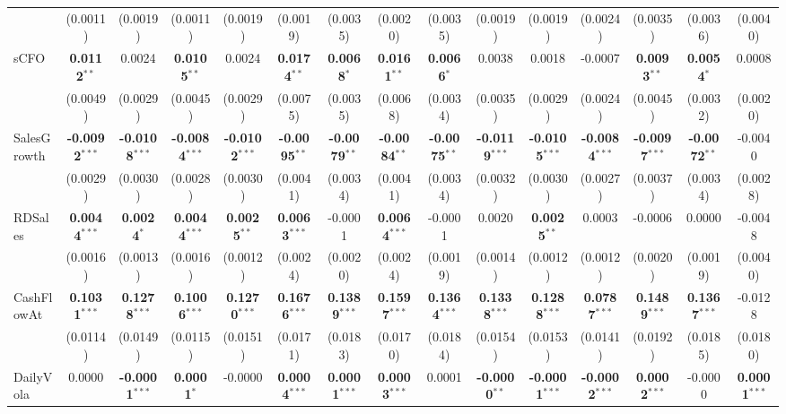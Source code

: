 \documentclass[11pt,a4paper]{article}
\begin{document}
\begin{table}[htbp]
\begin{tabular}{lcccccccccccccc}
 & (0.0011) & (0.0019) & (0.0011) & (0.0019) & (0.0019) & (0.0035) & (0.0020) & (0.0035) & (0.0019) & (0.0019) & (0.0024) & (0.0035) & (0.0036) & (0.0040) \\
sCFO & \textbf{0.0112}$^{**}$ & 0.0024 & \textbf{0.0105}$^{**}$ & 0.0024 & \textbf{0.0174}$^{**}$ & \textbf{0.0068}$^{*}$ & \textbf{0.0161}$^{**}$ & \textbf{0.0066}$^{*}$ & 0.0038 & 0.0018 & -0.0007 & \textbf{0.0093}$^{**}$ & \textbf{0.0054}$^{*}$ & 0.0008 \\
 & (0.0049) & (0.0029) & (0.0045) & (0.0029) & (0.0075) & (0.0035) & (0.0068) & (0.0034) & (0.0035) & (0.0029) & (0.0024) & (0.0045) & (0.0032) & (0.0020) \\
SalesGrowth & \textbf{-0.0092}$^{***}$ & \textbf{-0.0108}$^{***}$ & \textbf{-0.0084}$^{***}$ & \textbf{-0.0102}$^{***}$ & \textbf{-0.0095}$^{**}$ & \textbf{-0.0079}$^{**}$ & \textbf{-0.0084}$^{**}$ & \textbf{-0.0075}$^{**}$ & \textbf{-0.0119}$^{***}$ & \textbf{-0.0105}$^{***}$ & \textbf{-0.0084}$^{***}$ & \textbf{-0.0097}$^{***}$ & \textbf{-0.0072}$^{**}$ & -0.0040 \\
 & (0.0029) & (0.0030) & (0.0028) & (0.0030) & (0.0041) & (0.0034) & (0.0041) & (0.0034) & (0.0032) & (0.0030) & (0.0027) & (0.0037) & (0.0034) & (0.0028) \\
RDSales & \textbf{0.0044}$^{***}$ & \textbf{0.0024}$^{*}$ & \textbf{0.0044}$^{***}$ & \textbf{0.0025}$^{**}$ & \textbf{0.0063}$^{***}$ & -0.0001 & \textbf{0.0064}$^{***}$ & -0.0001 & 0.0020 & \textbf{0.0025}$^{**}$ & 0.0003 & -0.0006 & 0.0000 & -0.0048 \\
 & (0.0016) & (0.0013) & (0.0016) & (0.0012) & (0.0024) & (0.0020) & (0.0024) & (0.0019) & (0.0014) & (0.0012) & (0.0012) & (0.0020) & (0.0019) & (0.0040) \\
CashFlowAt & \textbf{0.1031}$^{***}$ & \textbf{0.1278}$^{***}$ & \textbf{0.1006}$^{***}$ & \textbf{0.1270}$^{***}$ & \textbf{0.1676}$^{***}$ & \textbf{0.1389}$^{***}$ & \textbf{0.1597}$^{***}$ & \textbf{0.1364}$^{***}$ & \textbf{0.1338}$^{***}$ & \textbf{0.1288}$^{***}$ & \textbf{0.0787}$^{***}$ & \textbf{0.1489}$^{***}$ & \textbf{0.1367}$^{***}$ & -0.0128 \\
 & (0.0114) & (0.0149) & (0.0115) & (0.0151) & (0.0171) & (0.0183) & (0.0170) & (0.0184) & (0.0154) & (0.0153) & (0.0141) & (0.0192) & (0.0185) & (0.0180) \\
DailyVola & 0.0000 & \textbf{-0.0001}$^{***}$ & \textbf{0.0001}$^{*}$ & -0.0000 & \textbf{0.0004}$^{***}$ & \textbf{0.0001}$^{***}$ & \textbf{0.0003}$^{***}$ & 0.0001 & \textbf{-0.0000}$^{**}$ & \textbf{-0.0001}$^{***}$ & \textbf{-0.0002}$^{***}$ & \textbf{0.0002}$^{***}$ & -0.0000 & \textbf{0.0001}$^{***}$ \\

\end{tabular}
\end{table}
\end{document}

